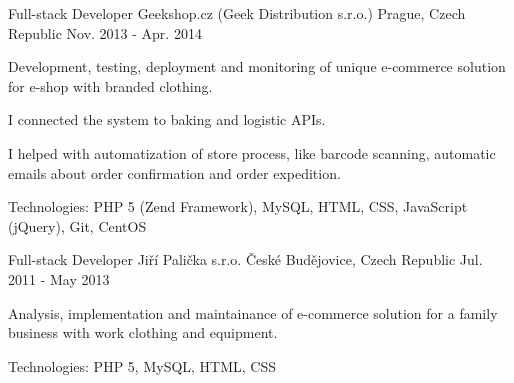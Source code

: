 \begin{cventries}
{\begin{cvitems}
      \end{cvitems}
    }
  \cventry
    {Full-stack Developer}
    {Geekshop.cz (Geek Distribution s.r.o.)}
    {Prague, Czech Republic}
    {Nov. 2013 - Apr. 2014}
    {
      \begin{cvitems}
        \item {Development, testing, deployment and monitoring of unique e-commerce solution for e-shop with branded clothing.}
        \item {I connected the system to baking and logistic APIs.}
        \item {I helped with automatization of store process, like barcode scanning, automatic emails about order confirmation and order expedition.}
        \item {Technologies: PHP 5 (Zend Framework), MySQL, HTML, CSS, JavaScript (jQuery), Git, CentOS}
      \end{cvitems}
    }
  \cventry
    {Full-stack Developer}
    {Jiří Palička s.r.o.}
    {České Budějovice, Czech Republic}
    {Jul. 2011 - May 2013}
    {
      \begin{cvitems}
        \item {Analysis, implementation and maintainance of e-commerce solution for a family business with work clothing and equipment.}
        \item {Technologies: PHP 5, MySQL, HTML, CSS}
      \end{cvitems}
    }
\end{cventries}
